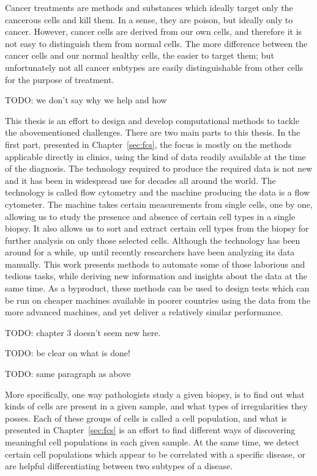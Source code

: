 Cancer treatments are methods and substances which ideally target only the
cancerous cells and kill them. In a sense, they are poison, but ideally only to
cancer. However, cancer cells are derived from our own cells, and therefore it
is not easy to distinguish them from normal cells. The more difference between
the cancer cells and our normal healthy cells, the easier to target them; but
unfortunately not all cancer subtypes are easily distinguishable from other
cells for the purpose of treatment.

TODO: we don't say why we help and how

This thesis is an effort to design and develop computational methods to tackle
the abovementioned challenges. There are two main parts to this thesis. In the
first part, presented in Chapter~\ref{sec:fcs}, the focus is mostly on the
methods applicable directly in clinics, using the kind of data readily
available at the time of the diagnosis. The technology required to produce the
required data is not new and it has been in widespread use for decades all
around the world. The technology is called flow cytometry and the machine
producing the data is a flow cytometer. The machine takes certain measurements
from single cells, one by one, allowing us to study the presence and absence of
certain cell types in a single biopsy. It also allows us to sort and extract
certain cell types from the biopsy for further analysis on only those selected
cells. Although the technology has been around for a while, up until recently
researchers have been analyzing its data manually. This work presents methods
to automate some of those laborious and tedious tasks, while deriving new
information and insights about the data at the same time. As a byproduct, these
methods can be used to design tests which can be run on cheaper machines
available in poorer countries using the data from the more advanced machines,
and yet deliver a relatively similar performance.

TODO: chapter 3 doesn't seem new here.

TODO: be clear on what is done!

TODO: same paragraph as above

More specifically, one way pathologists study a given biopsy, is to find out
what kinds of cells are present in a given sample, and what types of
irregularities they posses. Each of these groups of cells is called a cell
population, and what is presented in Chapter~\ref{sec:fcs} is an effort to find
different ways of discovering meaningful cell populations in each given sample.
At the same time, we detect certain cell populations which appear to be
correlated with a specific disease, or are helpful differentiating between
two subtypes of a disease.

